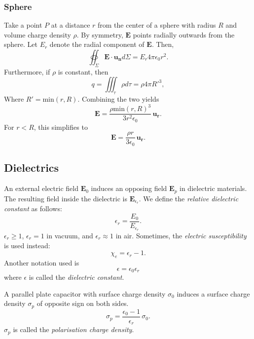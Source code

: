 \documentclass[a4paper, 12pt]{article}
\renewcommand{\vec}[1]{\mathbf{#1}}
\newcommand{\E}{\ensuremath{\vec{E}}}
\newcommand{\e}{\ensuremath{\epsilon_0}}
\begin{document}
    \subsubsection{Sphere}
        Take a point $P$ at a distance $r$ from the center of a sphere with radius $R$ and volume charge density $\rho$. 
        By symmetry, $\E$ points radially outwards from the sphere. Let $E_r$ denote the radial component of $\E$. Then, 
        \begin{equation*}
            \oiint_\Sigma \E\cdot\vec{u_n}d\Sigma = E_r4\pi\e r^2.
        \end{equation*}
        Furthermore, if $\rho$ is constant, then
        \begin{equation*}
            q = \iiint_\tau \rho d\tau = \rho4\pi R'^3,
        \end{equation*}
        Where $R' = \text{min}(r, R)$. Combining the two yields
        \begin{equation}
            \E = \frac{\rho \text{min}(r, R)^3}{3r^2\e}\,\vec{u_r}.
        \end{equation}
        For $r < R$, this simplifies to
        \begin{equation}
            \E = \frac{\rho r}{3\e}\,\vec{u_r}.
        \end{equation}

\subsection{Dielectrics}    
    An external electric field $\E_0$ induces an opposing field $\E_p$ in dielectric materials. 
    The resulting field inside the dielectric is $\E_{\epsilon_r}$. We define the \textit{relative dielectric constant} as follows: 
    \begin{equation}
        \epsilon_r = \frac{E_0}{E_{\epsilon_r}}.
    \end{equation}
    $\epsilon_r \geq 1$,  $\epsilon_r = 1$ in vacuum, and $\epsilon_r \approx 1$ in air.
    Sometimes, the \textit{electric susceptibility} is used instead:
    \begin{equation}
        \chi_e = \epsilon_r -1.
    \end{equation}
    Another notation used is 
    \begin{equation}
        \epsilon = \e\epsilon_r
    \end{equation}
    where $\epsilon$ is called the \textit{dielectric constant}.
    
    A parallel plate capacitor with surface charge density $\sigma_0$ induces a surface charge density $\sigma_p$ of opposite sign on both sides. 
    \begin{equation}
        \sigma_p = \frac{\e -1}{\epsilon_r}\,\sigma_0.
    \end{equation}
    $\sigma_p$ is called the \textit{polarisation charge density}.
    
\end{document}
